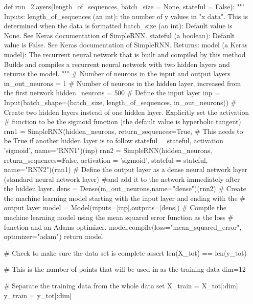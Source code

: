 \documentclass[%
oneside,                 %
final,                   %
10pt]{article}
\begin{document}
\bpycod
def rnn_2layers(length_of_sequences, batch_size = None, stateful = False):
    """
        Inputs:
            length_of_sequences (an int): the number of y values in "x data".  This is determined
                when the data is formatted
            batch_size (an int): Default value is None.  See Keras documentation of SimpleRNN.
            stateful (a boolean): Default value is False.  See Keras documentation of SimpleRNN.
        Returns:
            model (a Keras model): The recurrent neural network that is built and compiled by this
                method
        Builds and compiles a recurrent neural network with two hidden layers and returns the model.
    """
    # Number of neurons in the input and output layers
    in_out_neurons = 1
    # Number of neurons in the hidden layer, increased from the first network
    hidden_neurons = 500
    # Define the input layer
    inp = Input(batch_shape=(batch_size, 
                length_of_sequences, 
                in_out_neurons))  
    # Create two hidden layers instead of one hidden layer.  Explicitly set the activation
    # function to be the sigmoid function (the default value is hyperbolic tangent)
    rnn1 = SimpleRNN(hidden_neurons, 
                    return_sequences=True,  # This needs to be True if another hidden layer is to follow
                    stateful = stateful, activation = 'sigmoid',
                    name="RNN1")(inp)
    rnn2 = SimpleRNN(hidden_neurons, 
                    return_sequences=False, activation = 'sigmoid',
                    stateful = stateful,
                    name="RNN2")(rnn1)
    # Define the output layer as a dense neural network layer (standard neural network layer)
    #and add it to the network immediately after the hidden layer.
    dens = Dense(in_out_neurons,name="dense")(rnn2)
    # Create the machine learning model starting with the input layer and ending with the 
    # output layer
    model = Model(inputs=[inp],outputs=[dens])
    # Compile the machine learning model using the mean squared error function as the loss 
    # function and an Adams optimizer.
    model.compile(loss="mean_squared_error", optimizer="adam")  
    return model

# Check to make sure the data set is complete
assert len(X_tot) == len(y_tot)

# This is the number of points that will be used in as the training data
dim=12

# Separate the training data from the whole data set
X_train = X_tot[:dim]
y_train = y_tot[:dim]
\end{document}
